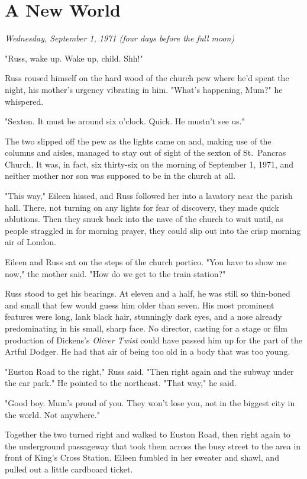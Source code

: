
\chapter{A New World}

\emph{Wednesday, September 1, 1971 (four days before the full moon)}

"Russ, wake up. Wake up, child. Shh!"

Russ roused himself on the hard wood of the church pew where he'd spent the night, his mother's urgency vibrating in him. "What's happening, Mum?" he whispered.

"Sexton. It must be around six o'clock. Quick. He mustn't see us."

The two slipped off the pew as the lights came on and, making use of the columns and aisles, managed to stay out of sight of the sexton of St.~Pancras Church. It was, in fact, six thirty-six on the morning of September 1, 1971, and neither mother nor son was supposed to be in the church at all.

"This way," Eileen hissed, and Russ followed her into a lavatory near the parish hall. There, not turning on any lights for fear of discovery, they made quick ablutions. Then they snuck back into the nave of the church to wait until, as people straggled in for morning prayer, they could slip out into the crisp morning air of London.

Eileen and Russ sat on the steps of the church portico. "You have to show me now," the mother said. "How do we get to the train station?"

Russ stood to get his bearings. At eleven and a half, he was still so thin-boned and small that few would guess him older than seven. His most prominent features were long, lank black hair, stunningly dark eyes, and a nose already predominating in his small, sharp face. No director, casting for a stage or film production of Dickens's \emph{Oliver Twist} could have passed him up for the part of the Artful Dodger. He had that air of being too old in a body that was too young.

"Euston Road to the right," Russ said. "Then right again and the subway under the car park." He pointed to the northeast. "That way," he said.

"Good boy. Mum's proud of you. They won't lose you, not in the biggest city in the world. Not anywhere."

Together the two turned right and walked to Euston Road, then right again to the underground passageway that took them across the busy street to the area in front of King's Cross Station. Eileen fumbled in her sweater and shawl, and pulled out a little cardboard ticket.

